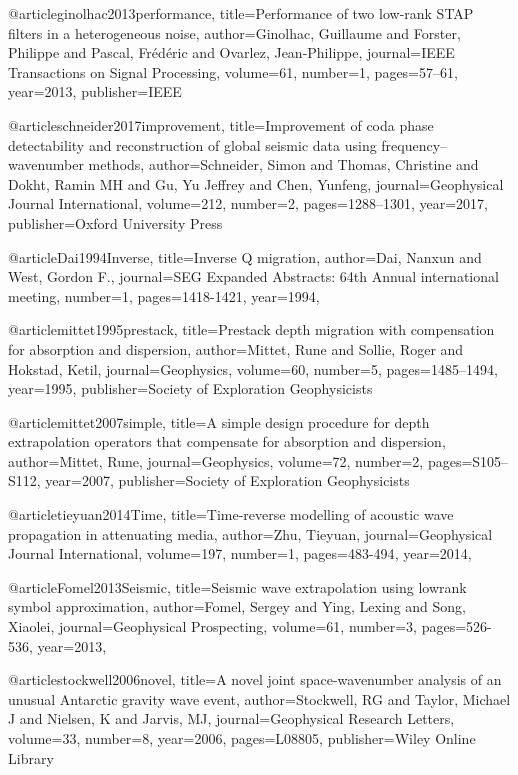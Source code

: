 @article{ginolhac2013performance,
  title={Performance of two low-rank STAP filters in a heterogeneous noise},
  author={Ginolhac, Guillaume and Forster, Philippe and Pascal, Fr{\'e}d{\'e}ric and Ovarlez, Jean-Philippe},
  journal={IEEE Transactions on Signal Processing},
  volume={61},
  number={1},
  pages={57--61},
  year={2013},
  publisher={IEEE}
}


@article{schneider2017improvement,
  title={Improvement of coda phase detectability and reconstruction of global seismic data using frequency--wavenumber methods},
  author={Schneider, Simon and Thomas, Christine and Dokht, Ramin MH and Gu, Yu Jeffrey and Chen, Yunfeng},
  journal={Geophysical Journal International},
  volume={212},
  number={2},
  pages={1288--1301},
  year={2017},
  publisher={Oxford University Press}
}




@article{Dai1994Inverse,
  title={Inverse {Q} migration},
  author={Dai, Nanxun and West, Gordon F.},
  journal={SEG Expanded Abstracts: 64th Annual international meeting},
  number={1},
  pages={1418-1421},
  year={1994},
}

@article{mittet1995prestack,
  title={Prestack depth migration with compensation for absorption and dispersion},
  author={Mittet, Rune and Sollie, Roger and Hokstad, Ketil},
  journal={Geophysics},
  volume={60},
  number={5},
  pages={1485--1494},
  year={1995},
  publisher={Society of Exploration Geophysicists}
}

@article{mittet2007simple,
  title={A simple design procedure for depth extrapolation operators that compensate for absorption and dispersion},
  author={Mittet, Rune},
  journal={Geophysics},
  volume={72},
  number={2},
  pages={S105--S112},
  year={2007},
  publisher={Society of Exploration Geophysicists}
}

@article{tieyuan2014Time,
  title={Time-reverse modelling of acoustic wave propagation in attenuating media},
  author={Zhu, Tieyuan},
  journal={Geophysical Journal International},
  volume={197},
  number={1},
  pages={483-494},
  year={2014},
}

@article{Fomel2013Seismic,
  title={Seismic wave extrapolation using lowrank symbol approximation},
  author={Fomel, Sergey and Ying, Lexing and Song, Xiaolei},
  journal={Geophysical Prospecting},
  volume={61},
  number={3},
  pages={526-536},
  year={2013},
}

@article{stockwell2006novel,
  title={A novel joint space-wavenumber analysis of an unusual Antarctic gravity wave event},
  author={Stockwell, RG and Taylor, Michael J and Nielsen, K and Jarvis, MJ},
  journal={Geophysical Research Letters},
  volume={33},
  number={8},
  year={2006},
  pages={L08805},
  publisher={Wiley Online Library}
}

